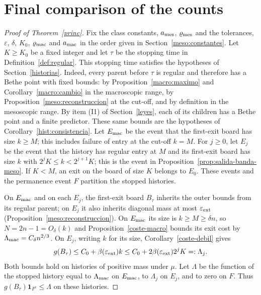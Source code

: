 \section{Final comparison of the counts}\label{balance}

\begin{proof}[Proof of Theorem~\ref{princ}]
Fix the class constants, $a_{\rm mes}$, $\varrho_{\rm mes}$ and the tolerances, $\varepsilon$,
$\delta$, $K_0$, $\varrho_{\rm mac}$ and $a_{\rm mac}$ in the order given in
Section~\ref{meso:constantes}. Let $K\ge K_0$ be a fixed integer and let $\tau$ be the stopping
time in Definition~\ref{def:regular}. This stopping time satisfies the hypotheses of
Section~\ref{historias}. Indeed, every parent before $\tau$ is regular and therefore has a Bethe
point with fixed bounds: by Proposition~\ref{macro:maximo} and Corollary~\ref{macro:cambio} in the
macroscopic range, by Proposition~\ref{meso:reconstruccion} at the cut-off, and by definition in
the mesoscopic range. By item (I1) of Section~\ref{leyes}, each of its children has a Bethe point
and a finite predictor. These same bounds are the hypotheses of
Corollary~\ref{hist:consistencia}. Let $E_{\rm mac}$ be the event that the first-exit board has
size ${k\ge M}$; this includes failure of entry at the cut-off $k=M$. For $j\ge0$, let $E_j$ be
the event that the history has regular entry at $M$ and its first-exit board has size $k$ with
${2^jK\le k<2^{j+1}K}$; this is the event in Proposition~\ref{prop:salida-banda-meso}. If $K<M$,
an exit on the board of size $K$ belongs to $E_0$. These events and the permanence event $F$
partition the stopped histories.

On $E_{\rm mac}$ and on each $E_j$, the first-exit board $B_\tau$ inherits the outer bounds from
its regular parent; on $E_j$ it also inherits diagonal mass at most $\varepsilon_{\rm ext}$
(Proposition~\ref{meso:reconstruccion}). On $E_{\rm mac}$ its size is $k\ge M\ge\delta n$, so
$N=2n-1=O_\delta(k)$ and Proposition~\ref{coste-macro} bounds its exit cost by
$\Lambda_{\rm mac}=C_\delta n^{2/3}$. On $E_j$, writing $k$ for its size,
Corollary~\ref{coste-debil} gives
\[
 g(B_\tau)\le C_0+\beta(\varepsilon_{\rm ext})k
           \le C_0+2\beta(\varepsilon_{\rm ext})2^jK=:\Lambda_j .
\]
Both bounds hold on histories of positive mass under $\mu$. Let $\Lambda$ be the function of the
stopped history equal to $\Lambda_{\rm mac}$ on $E_{\rm mac}$, to $\Lambda_j$ on $E_j$, and to zero
on $F$. Thus $g(B_\tau)\mathbf1_{F^c}\le\Lambda$ on these histories.


\end{proof}

